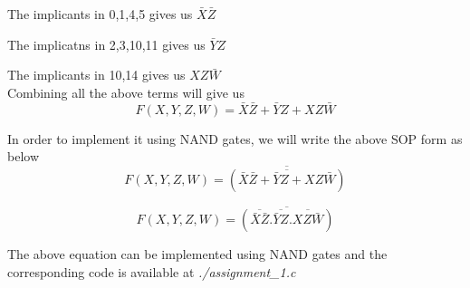 \documentclass[12pt]{article}
\begin{document}
The implicants in 0,1,4,5 gives us $\bar{X}\bar{Z}$

The implicatns in 2,3,10,11 gives us $\bar{Y}Z$

The implicants in 10,14 gives us $XZ\bar{W}$ \\

Combining all the above terms will give us 
\begin{equation}
    F(X,Y,Z,W) = \bar{X}\bar{Z} + \bar{Y}Z + XZ\bar{W}
\end{equation}

In order to implement it using NAND gates, we will write the above SOP form as below
\begin{equation}
    F(X,Y,Z,W) = \overline{(\overline{\bar{X}\bar{Z} + \bar{Y}Z + XZ\bar{W}})}
\end{equation}

\begin{equation}
    F(X,Y,Z,W) = \overline{(\overline{\bar{X}\bar{Z}} . \overline{\bar{Y}Z} . \overline{XZ\bar{W}})}
\end{equation}


The above equation can be implemented using NAND gates and the corresponding code is available at \textit{./assignment\_1.c}
\end{document}
